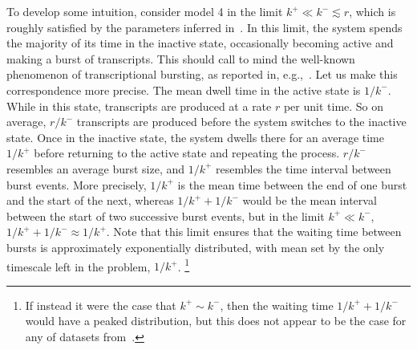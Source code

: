 To develop some intuition, consider model 4 in the limit $k^+ \ll k^- \lesssim
r$, which is roughly satisfied by the parameters inferred
in~\cite{Razo-Mejia2020}. In this limit, the system spends the majority of its
time in the inactive state, occasionally becoming active and making a burst of
transcripts. This should call to mind the well-known phenomenon of
transcriptional bursting, as reported in,
e.g.,~\cite{Golding2005,Chong2014,Sevier2016}. Let us make this correspondence more precise. The mean dwell
time in the active state is $1/k^-$. While in this state, transcripts are
produced at a rate $r$ per unit time. So on average, $r/k^-$ transcripts are
produced before the system switches to the inactive state. Once in the inactive
state, the system dwells there for an average time $1/k^+$ before returning to
the active state and repeating the process. $r/k^-$ resembles an average burst
size, and $1/k^+$ resembles the time interval between burst events. More
precisely, $1/k^+$ is the mean time between the end of one burst and the start
of the next, whereas $1/k^+ + 1/k^-$ would be the mean interval between the
start of two successive burst events, but in the limit $k^+ \ll k^-$, $1/k^+ +
1/k^- \approx 1/k^+$. Note that this limit ensures that the waiting time between
bursts is approximately exponentially distributed, with mean set by the only
timescale left in the problem, $1/k^+$.
\footnote{If instead it were the case that $k^+ \sim k^-$, then the waiting time
$1/k^+ + 1/k^-$ would have a peaked distribution, but this does not appear to be
the case for any of datasets from~\cite{Jones2014}.}

